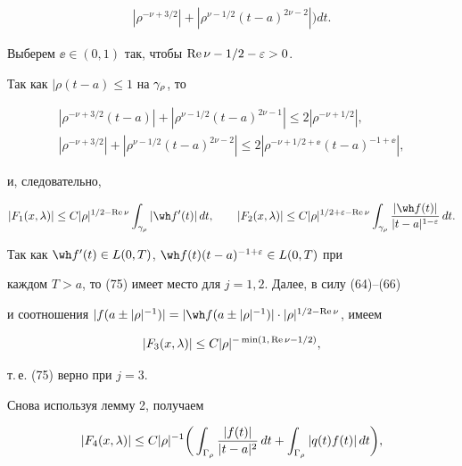 \begin{pf}
\begin{pf}
\begin{align*}
|\rho^{-\nu+3/2}|+|\rho^{\nu-1/2}(t-a)^{2\nu-2}|\big) dt.


\end{align*}


Выберем $\ee\in (0,1)$ так, чтобы $\operatorname{Re}\nu-1/2-\varepsilon>0$.


Так как $|\rho(t-a)\le 1$ на $\gamma_{\rho}$, то


\begin{gather*}


|\rho^{-\nu+3/2}(t-a)|+|\rho^{\nu-1/2}(t-a)^{2\nu-1}


|\le 2|\rho^{-\nu+1/2}|, \\


%


|\rho^{-\nu+3/2}|+


|\rho^{\nu-1/2}(t-a)^{2\nu-2}|\le 2|\rho^{-\nu+1/2+\ee}(t-a)^{-1+\ee}|,


\end{gather*}


и, следовательно,


$$


|F_1(x,\la)|\le C|\rho|^{1/2-\re \nu} \int_{\ga_{\rho}} |\wh f'(t)|\,dt,


\qquad |F_2(x,\la)|\le C|\rho|^{1/2+\ee-\re \nu}


\int_{\ga_{\rho}}  \frac{|\wh f(t)|}{|t-a|^{1-\ee}}\,dt.


$$


Так как $\wh f'(t)\in L(0,T)$, $\wh f(t)(t-a)^{-1+\ee}\in L(0,T)$ при


каждом $T>a$, то (75) имеет место для $j=1,2$. Далее, в силу (64)--(66)


и соотношения $|f(a\pm |\rho|^{-1})|=|\wh f(a\pm |\rho|^{-1})|\cdot


|\rho|^{1/2-\re \nu}$, имеем


$$


|F_3(x,\la)| \le C|\rho|^{-\min(1,\,\re \nu-1/2)},


$$


т.\,е. (75) верно при $j=3$.


Снова используя лемму 2, получаем


\begin{align}


|F_4(x,\la)|&\le C|\rho|^{-1}\bigg(


\int_{\Gamma_{\rho}} \frac{|f(t)|}{|t-a|^2}\,dt+


\int_{\Gamma_{\rho}}|q(t)f(t)|\,dt\bigg),\\


%



\end{align}
\end{pf}
\end{pf}
